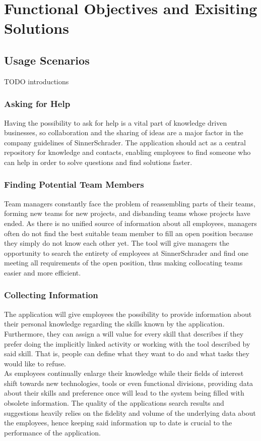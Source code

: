 \chapter{Functional Objectives and Exisiting Solutions}

\section{Usage Scenarios}
TODO introductions

\subsection{Asking for Help}
Having the possibility to ask for help is a vital part of knowledge driven
businesses, so collaboration and the sharing of ideas are a major factor in the company guidelines
of SinnerSchrader. The application should act as a central repository for knowledge and contacts,
enabling employees to find someone who can help in order to solve questions and find solutions faster.

\subsection{Finding Potential Team Members}
Team managers constantly face the problem of reassembling parts of their teams, forming new teams for new projects, and
disbanding teams whose projects have ended. As there is no unified source of information about all employees, managers often
do not find the best suitable team member to fill an open position because they simply do not know each other yet.
The tool will give managers the opportunity to search the entirety of employees at SinnerSchrader and find one
meeting all requirements of the open position, thus making collocating teams easier and more efficient.

\subsection{Collecting Information}
The application will give employees the possibility to provide information about their personal knowledge regarding the
skills known by the application. Furthermore, they can assign a will value for every skill that describes if they prefer
doing the implicitly linked activity or working with the tool described by said skill. That is, people can define what they want to do and what tasks they would like to refuse.\\
As employees continually enlarge their knowledge while their fields of interest shift towards new technologies, tools or even
functional divisions, providing data about their skills and preference once will lead to the system being filled with obsolete
information. The quality of the applications search results and suggestions heavily relies on the fidelity and volume of the underlying data about the employees, hence keeping said information up to date is crucial to the performance of the application.

